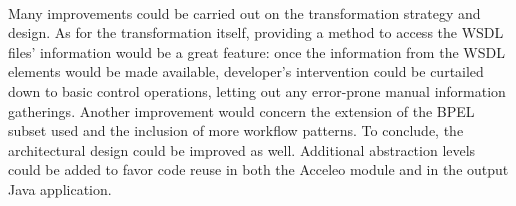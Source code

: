 \paragraph{}
Many improvements could be carried out on the transformation strategy and design. As for the transformation itself, providing a method to access the WSDL files' information would be a great feature: once the information from the WSDL elements would be made available, developer's intervention could be curtailed down to basic control operations, letting out any error-prone manual information gatherings.
Another improvement would concern the extension of the BPEL subset used and the inclusion of more workflow patterns.
To conclude, the architectural design could be improved as well. Additional abstraction levels could be added to favor code reuse in both the Acceleo module and in the output Java application. 


